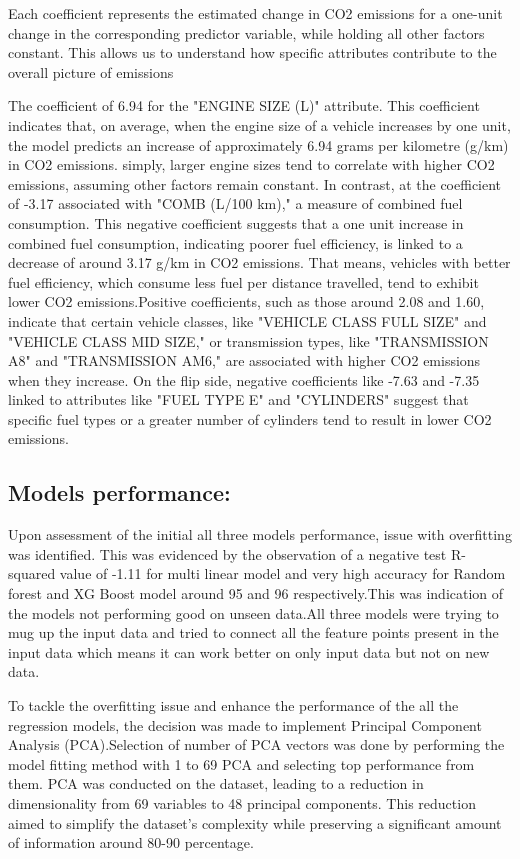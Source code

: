 \documentclass[12pt, a4paper,oneside]{book}
\numberwithin{equation}{section}
\begin{document}
Each coefficient represents the estimated change in CO2 emissions for a one-unit change in the corresponding predictor variable, while holding all other factors constant. This allows us to understand how specific attributes contribute to the overall picture of emissions

The coefficient of 6.94 for the "ENGINE SIZE (L)" attribute. This coefficient indicates that, on average, when the engine size of a vehicle increases by one unit, the model predicts an increase of approximately 6.94 grams per kilometre (g/km) in CO2 emissions. simply, larger engine sizes tend to correlate with higher CO2 emissions, assuming other factors remain constant. In contrast, at the coefficient of -3.17 associated with "COMB (L/100 km)," a measure of combined fuel consumption. This negative coefficient suggests that a one unit increase in combined fuel consumption, indicating poorer fuel efficiency, is linked to a decrease of around 3.17 g/km in CO2 emissions. That means, vehicles with better fuel efficiency, which consume less fuel per distance travelled, tend to exhibit lower CO2 emissions.Positive coefficients, such as those around 2.08 and 1.60, indicate that certain vehicle classes, like "VEHICLE CLASS FULL SIZE" and "VEHICLE CLASS MID SIZE," or transmission types, like "TRANSMISSION A8" and "TRANSMISSION AM6," are associated with higher CO2 emissions when they increase. On the flip side, negative coefficients like -7.63 and -7.35 linked to attributes like "FUEL TYPE E" and "CYLINDERS" suggest that specific fuel types or a greater number of cylinders tend to result in lower CO2 emissions.

\subsection{Models performance:}

Upon assessment of the initial all three models performance,  issue with overfitting was identified. This was evidenced by the observation of a negative test R-squared value of -1.11 for multi linear model and very high accuracy for Random forest and XG Boost model around 95 and 96 respectively.This was indication of the models not performing good on unseen data.All three models were trying to mug up the input data and tried to connect all the feature points present in the input data which means it can work better on only input data but not on new data.

To tackle the overfitting issue and enhance the performance of the all the regression models, the decision was made to implement Principal Component Analysis (PCA).Selection of number of PCA vectors was done by performing the model fitting method with 1 to 69 PCA and selecting top performance from them.
PCA was conducted on the dataset, leading to a reduction in dimensionality from 69 variables to 48 principal components. This reduction aimed to simplify the dataset's complexity while preserving a significant amount of information around 80-90 percentage.
\end{document}
